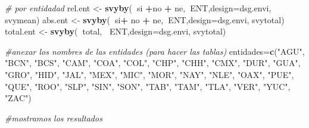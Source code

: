 \documentclass[
]{article}
\newenvironment{Shaded}{\begin{snugshade}}{\end{snugshade}}
\newcommand{\CommentTok}[1]{\textcolor[rgb]{0.56,0.35,0.01}{\textit{#1}}}
\newcommand{\DataTypeTok}[1]{\textcolor[rgb]{0.13,0.29,0.53}{#1}}
\newcommand{\KeywordTok}[1]{\textcolor[rgb]{0.13,0.29,0.53}{\textbf{#1}}}
\newcommand{\NormalTok}[1]{#1}
\newcommand{\OperatorTok}[1]{\textcolor[rgb]{0.81,0.36,0.00}{\textbf{#1}}}
\newcommand{\StringTok}[1]{\textcolor[rgb]{0.31,0.60,0.02}{#1}}
\begin{document}
\begin{Shaded}
\begin{Highlighting}[]
\CommentTok{# por entidadad }
\NormalTok{rel.ent <-}\StringTok{ }\KeywordTok{svyby}\NormalTok{(}\OperatorTok{~}\NormalTok{si }\OperatorTok{+}\NormalTok{no }\OperatorTok{+}\StringTok{ }\NormalTok{ne,}\OperatorTok{~}\NormalTok{ENT,}\DataTypeTok{design=}\NormalTok{dsg.envi, svymean)}
\NormalTok{abs.ent <-}\StringTok{ }\KeywordTok{svyby}\NormalTok{(}\OperatorTok{~}\NormalTok{si}\OperatorTok{+}\StringTok{ }\NormalTok{no }\OperatorTok{+}\StringTok{ }\NormalTok{ne,}\OperatorTok{~}\NormalTok{ENT,}\DataTypeTok{design=}\NormalTok{dsg.envi, svytotal)}
\NormalTok{total.ent <-}\StringTok{ }\KeywordTok{svyby}\NormalTok{(}\OperatorTok{~}\NormalTok{total, }\OperatorTok{~}\NormalTok{ENT,}\DataTypeTok{design=}\NormalTok{dsg.envi, svytotal)}

\CommentTok{#anexar los nombres de las entidades (para hacer las tablas)}
\NormalTok{entidades=}\KeywordTok{c}\NormalTok{(}\StringTok{"AGU"}\NormalTok{, }\StringTok{"BCN"}\NormalTok{, }\StringTok{"BCS"}\NormalTok{, }\StringTok{"CAM"}\NormalTok{, }\StringTok{"COA"}\NormalTok{, }\StringTok{"COL"}\NormalTok{, }\StringTok{"CHP"}\NormalTok{, }\StringTok{"CHH"}\NormalTok{, }\StringTok{"CMX"}\NormalTok{, }
            \StringTok{"DUR"}\NormalTok{, }\StringTok{"GUA"}\NormalTok{, }\StringTok{"GRO"}\NormalTok{, }\StringTok{"HID"}\NormalTok{, }\StringTok{"JAL"}\NormalTok{, }\StringTok{"MEX"}\NormalTok{, }\StringTok{"MIC"}\NormalTok{, }\StringTok{"MOR"}\NormalTok{, }\StringTok{"NAY"}\NormalTok{, }\StringTok{"NLE"}\NormalTok{,}
            \StringTok{"OAX"}\NormalTok{, }\StringTok{"PUE"}\NormalTok{, }\StringTok{"QUE"}\NormalTok{, }\StringTok{"ROO"}\NormalTok{, }\StringTok{"SLP"}\NormalTok{, }\StringTok{"SIN"}\NormalTok{, }\StringTok{"SON"}\NormalTok{, }\StringTok{"TAB"}\NormalTok{, }\StringTok{"TAM"}\NormalTok{, }\StringTok{"TLA"}\NormalTok{,}
            \StringTok{"VER"}\NormalTok{, }\StringTok{"YUC"}\NormalTok{, }\StringTok{"ZAC"}\NormalTok{)}

\CommentTok{#mostramos los resultados}
\end{Highlighting}
\end{Shaded}
\end{document}
